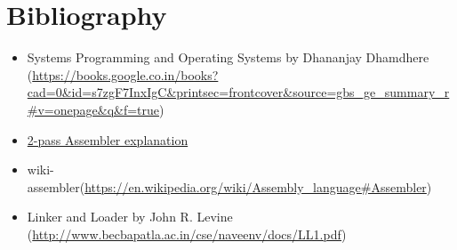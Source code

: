 \documentclass[12pt]{article}
\begin{document}

% 

% 
\section{Bibliography}
\begin{itemize}
\item Systems Programming and Operating Systems
by Dhananjay Dhamdhere (\url{https://books.google.co.in/books?cad=0&id=s7zgF7InxIgC&printsec=frontcover&source=gbs_ge_summary_r#v=onepage&q&f=true})
\item \href{https://www.slideshare.net/ShubhamShah001/two-pass-assembler}{2-pass Assembler explanation }
\item wiki-assembler(\url{https://en.wikipedia.org/wiki/Assembly_language#Assembler})
\item Linker and Loader by John R. Levine (\url{http://www.becbapatla.ac.in/cse/naveenv/docs/LL1.pdf})
\end{itemize}
\end{document}
